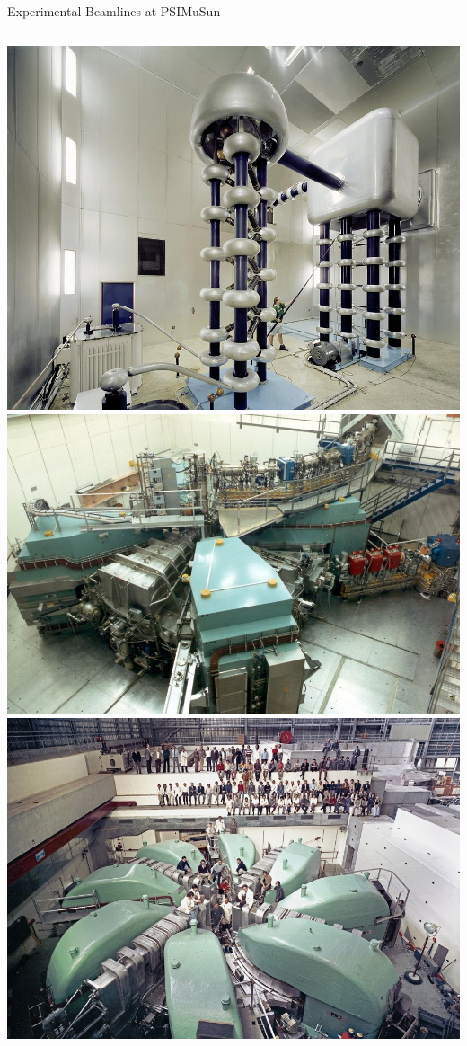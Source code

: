 \documentclass{beamer}
\begin{document}
\begin{frame}{Experimental Beamlines at PSI}{MuSun}
\begin{columns}[onlytextwidth]
\begin{column}{0.25\textwidth}
  \includegraphics[height=0.25\textheight]{figures/cw.jpg} \\
  \includegraphics[height=0.25\textheight, trim=0 0 1.4cm 0, clip]{figures/inj.jpg} \\
 \includegraphics[height=0.25\textheight, trim=0 0 2.95cm 0, clip]{figures/rz.jpg}\\

\end{column}
\end{columns}
\end{frame}
\end{document}
